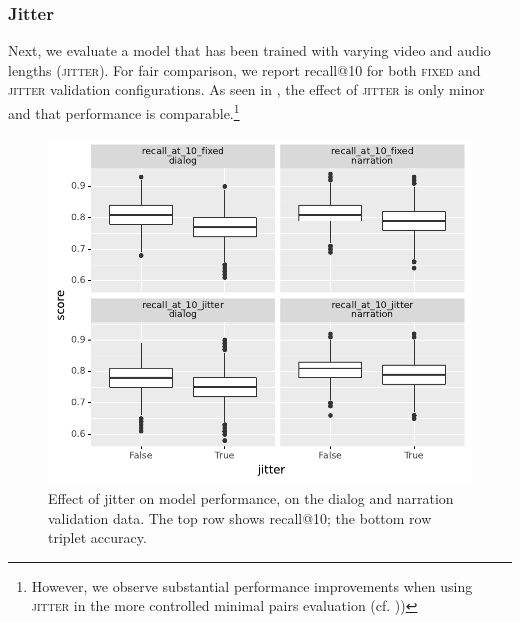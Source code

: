 \subsubsection{Jitter}
Next, we evaluate a model that has been trained with varying video and audio 
lengths (\textsc{jitter}). For fair comparison, we report recall@10 for both 
\textsc{fixed} and \textsc{jitter} validation configurations.
As seen in , the effect of \textsc{jitter} is only
minor and that performance is comparable.\footnote{However, we observe 
substantial performance improvements when using \textsc{jitter} in the more 
controlled minimal pairs evaluation (cf. ))}
\begin{figure}[htb]
	\centering
	\includegraphics[width=\columnwidth]{results/ablations/jitter.pdf}
	\caption{Effect of jitter on model performance, on the dialog
          and narration validation data. The top row shows recall@10;
          the bottom row triplet accuracy.}
	\label{fig:jitter}
\end{figure}



